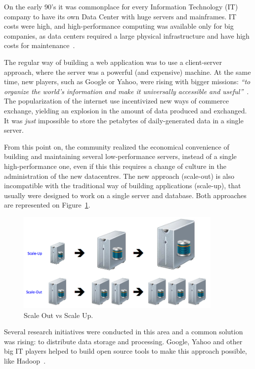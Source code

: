 On the early 90's it was commonplace for every Information Technology (IT) company to have its own Data Center with huge servers and mainframes. 
IT costs were high, and high-performance computing was available only for big companies, as data centers required a large physical infrastructure and have high costs for maintenance~\cite{Armbrust09m.:above}.

The regular way of building a web application was to use a client-server approach, where the server was a powerful (and expensive) machine. 
At the same time, new players, such as Google or Yahoo, were rising with bigger missions: \textit{``to organize the world's information and make it universally accessible and useful''}~\cite{Spector:2012:GHA:2209249.2209262}. 
The popularization of the internet use incentivized new ways of commerce exchange, yielding an explosion in the amount of data produced and exchanged. 
It was \textit{just} impossible to store the petabytes of daily-generated data in a single server. 

From this point on, the community realized the economical convenience of building and maintaining several low-performance servers, instead of a single high-performance one, even if this this requires a change of culture in the administration of the new datacentres. The new approach (scale-out) is also incompatible with the traditional way of building applications (scale-up), that usually were designed to work on a single server and database. Both approaches are represented on Figure~\ref{fig:scaleupout}.

\begin{figure}[ht!]
\centering
\includegraphics[width=100mm]{scaleOut.png}
\caption{Scale Out vs Scale Up.\cite{scaleupref} \label{fig:scaleupout}}
\end{figure}


Several research initiatives were conducted in this area and a common solution was rising: to distribute data storage and processing. 
Google, Yahoo and other big IT players helped to build open source tools to make this approach possible, like Hadoop~\cite{5496972}.



